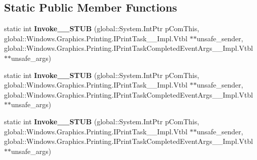 \subsection*{Static Public Member Functions}
\begin{DoxyCompactItemize}
\item 
\mbox{\label{struct_windows_1_1_foundation_1_1_typed_event_handler___a___windows___graphics___printing___prin4bbc544b6b23befe2861ab142a886e61_a12672c32dd9914a6ecbabd5722a81bcd}} 
static int {\bfseries Invoke\+\_\+\+\_\+\+S\+T\+UB} (global\+::\+System.\+Int\+Ptr p\+Com\+This, global\+::\+Windows.\+Graphics.\+Printing.\+I\+Print\+Task\+\_\+\+\_\+\+Impl.\+Vtbl $\ast$$\ast$unsafe\+\_\+sender, global\+::\+Windows.\+Graphics.\+Printing.\+I\+Print\+Task\+Completed\+Event\+Args\+\_\+\+\_\+\+Impl.\+Vtbl $\ast$$\ast$unsafe\+\_\+args)
\item 
\mbox{\label{struct_windows_1_1_foundation_1_1_typed_event_handler___a___windows___graphics___printing___prin4bbc544b6b23befe2861ab142a886e61_a12672c32dd9914a6ecbabd5722a81bcd}} 
static int {\bfseries Invoke\+\_\+\+\_\+\+S\+T\+UB} (global\+::\+System.\+Int\+Ptr p\+Com\+This, global\+::\+Windows.\+Graphics.\+Printing.\+I\+Print\+Task\+\_\+\+\_\+\+Impl.\+Vtbl $\ast$$\ast$unsafe\+\_\+sender, global\+::\+Windows.\+Graphics.\+Printing.\+I\+Print\+Task\+Completed\+Event\+Args\+\_\+\+\_\+\+Impl.\+Vtbl $\ast$$\ast$unsafe\+\_\+args)
\item 
\mbox{\label{struct_windows_1_1_foundation_1_1_typed_event_handler___a___windows___graphics___printing___prin4bbc544b6b23befe2861ab142a886e61_a12672c32dd9914a6ecbabd5722a81bcd}} 
static int {\bfseries Invoke\+\_\+\+\_\+\+S\+T\+UB} (global\+::\+System.\+Int\+Ptr p\+Com\+This, global\+::\+Windows.\+Graphics.\+Printing.\+I\+Print\+Task\+\_\+\+\_\+\+Impl.\+Vtbl $\ast$$\ast$unsafe\+\_\+sender, global\+::\+Windows.\+Graphics.\+Printing.\+I\+Print\+Task\+Completed\+Event\+Args\+\_\+\+\_\+\+Impl.\+Vtbl $\ast$$\ast$unsafe\+\_\+args)
\item 
\mbox{\label{struct_windows_1_1_foundation_1_1_typed_event_handler___a___windows___graphics___printing___prin4bbc544b6b23befe2861ab142a886e61_a12672c32dd9914a6ecbabd5722a81bcd}} 

\end{DoxyCompactItemize}
